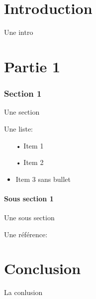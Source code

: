 \clearpage
\part*{Introduction}

	Une intro

	\clearpage


	\newpage

\newpage
\part{Partie 1}


	\section{Section 1}

		Une section

		Une liste:
		\begin{itemize}
	    \item[•] Item 1
	    \item[•] Item 2
	    \item Item 3 sans bullet
	  \end{itemize}

		\subsection{Sous section 1}

			Une sous section

			Une référence: \cite{ref_techreport}

\newpage
\part*{Conclusion}

		La conlusion
